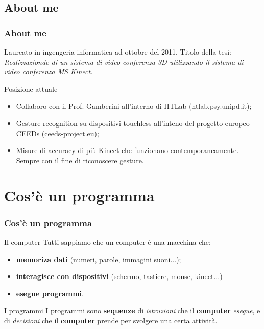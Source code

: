\subsection{About me}
\begin{frame}
\frametitle{About me}
\begin{block}{}
Laureato in ingengeria informatica ad ottobre del 2011. Titolo della
tesi: \textit{Realizzazionde di un sistema di video conferenza 3D utilizzando 
il sistema di video conferenza MS Kinect}.
\end{block}

\begin{block}{Posizione attuale}
\begin{itemize}
\item Collaboro con il Prof. Gamberini all'interno di HTLab (htlab.psy.unipd.it);
\item Gesture recognition su dispositivi touchless all'inteno del progetto europeo
CEEDs (ceeds-project.eu);
\item Misure di accuracy di più Kinect che funzionano contemporaneamente. Sempre con 
il fine di riconoscere gesture.
\end{itemize}
\end{block}
\end{frame}

\section{Cos'è un programma}
\begin{frame}
\frametitle{Cos'è un programma}
\begin{block}{Il computer}
Tutti sappiamo che un computer è una macchina che: 
\begin{itemize}
\item \textbf{memoriza dati} (numeri, parole, immagini suoni...);
\item \textbf{interagisce con dispositivi} (schermo, tastiere, mouse, kinect...)
\item \textbf{esegue programmi}.
\end{itemize}
\end{block}
\begin{block}{I programmi}
I programmi sono \textbf{sequenze} di \textit{istruzioni} che il \textbf{computer}
\textit{esegue}, e di \textit{decisioni} che il \textbf{computer} prende per svolgere
una certa attività.
\end{block}
\end{frame}
